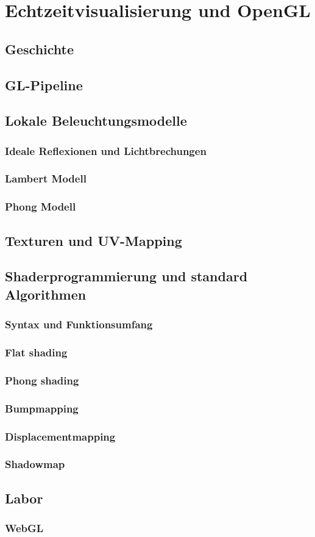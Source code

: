 \section{Echtzeitvisualisierung und OpenGL}
\subsection{Geschichte}
\subsection{GL-Pipeline}
\subsection{Lokale Beleuchtungsmodelle}
\subsubsection{Ideale Reflexionen und Lichtbrechungen}
\subsubsection{Lambert  Modell}
\subsubsection{Phong Modell}

\subsection{Texturen und UV-Mapping}
\subsection{Shaderprogrammierung und standard Algorithmen}
\subsubsection{Syntax und Funktionsumfang}
\subsubsection{Flat  shading}
\subsubsection{Phong  shading}
\subsubsection{Bumpmapping}
\subsubsection{Displacementmapping}
\subsubsection{Shadowmap}

\subsection{Labor}
\subsubsection{WebGL}
